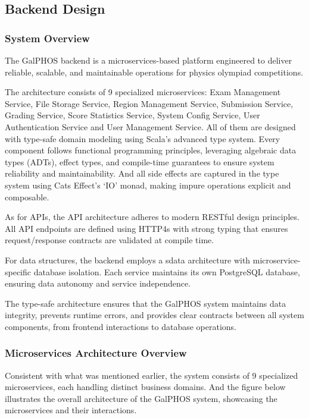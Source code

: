 \documentclass[12pt]{article}
\begin{document}
\subsection{Backend Design}

\subsubsection{System Overview}

The GalPHOS backend is a microservices-based platform engineered to deliver reliable, scalable, and maintainable operations for physics olympiad competitions. 

The architecture consists of 9 specialized microservices: Exam Management Service, File Storage Service, Region Management Service, Submission Service, Grading Service, Score Statistics Service, System Config Service, User Authentication Service and User Management Service. All of them are designed with type-safe domain modeling using Scala's advanced type system. Every component follows functional programming principles, leveraging algebraic data types (ADTs), effect types, and compile-time guarantees to ensure system reliability and maintainability. And all side effects are captured in the type system using Cats Effect's `IO' monad, making impure operations explicit and composable.

As for APIs, the API architecture adheres to modern RESTful design principles. All API endpoints are defined using HTTP4s with strong typing that ensures request/response contracts are validated at compile time. 

For data structures, the backend employs a sdata architecture with microservice-specific database isolation. Each service maintains its own PostgreSQL database, ensuring data autonomy and service independence.

The type-safe architecture ensures that the GalPHOS system maintains data integrity, prevents runtime errors, and provides clear contracts between all system components, from frontend interactions to database operations.

\subsubsection{Microservices Architecture Overview}

Consistent with what was mentioned earlier, the system consists of 9 specialized microservices, each handling distinct business domains. And the figure below illustrates the overall architecture of the GalPHOS system, showcasing the microservices and their interactions.
\end{document}
